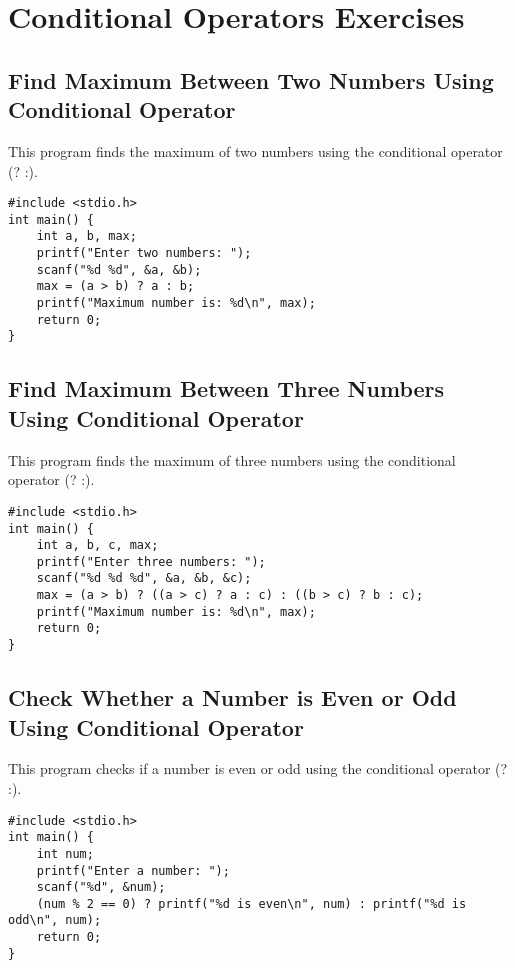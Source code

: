 \documentclass[a4paper,12pt]{article}
\begin{document}
\newpage

\section{Conditional Operators Exercises}

\subsection{Find Maximum Between Two Numbers Using Conditional Operator}
This program finds the maximum of two numbers using the conditional operator (? :).

\begin{lstlisting}[caption={Find Maximum Between Two Numbers Using Conditional Operator}]
#include <stdio.h>
int main() {
    int a, b, max;
    printf("Enter two numbers: ");
    scanf("%d %d", &a, &b);
    max = (a > b) ? a : b;
    printf("Maximum number is: %d\n", max);
    return 0;
}
\end{lstlisting}

\newpage

\subsection{Find Maximum Between Three Numbers Using Conditional Operator}
This program finds the maximum of three numbers using the conditional operator (? :).

\begin{lstlisting}[caption={Find Maximum Between Three Numbers Using Conditional Operator}]
#include <stdio.h>
int main() {
    int a, b, c, max;
    printf("Enter three numbers: ");
    scanf("%d %d %d", &a, &b, &c);
    max = (a > b) ? ((a > c) ? a : c) : ((b > c) ? b : c);
    printf("Maximum number is: %d\n", max);
    return 0;
}
\end{lstlisting}

\newpage

\subsection{Check Whether a Number is Even or Odd Using Conditional Operator}
This program checks if a number is even or odd using the conditional operator (? :).

\begin{lstlisting}[caption={Check Whether a Number is Even or Odd Using Conditional Operator}]
#include <stdio.h>
int main() {
    int num;
    printf("Enter a number: ");
    scanf("%d", &num);
    (num % 2 == 0) ? printf("%d is even\n", num) : printf("%d is odd\n", num);
    return 0;
}
\end{lstlisting}
\end{document}
